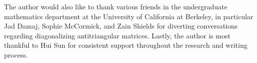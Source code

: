 \documentclass{amsart}
\begin{document}
The author would also like to thank various friends in the undergraduate mathematics department at the University of California at Berkeley, in particular Jad Damaj, Sophie McCormick, and Zain Shields for diverting conversations regarding diagonalizing antitriangular matrices. Lastly, the author is most thankful to Hui Sun for consistent support throughout the research and writing process.







\printbibliography
\end{document}
